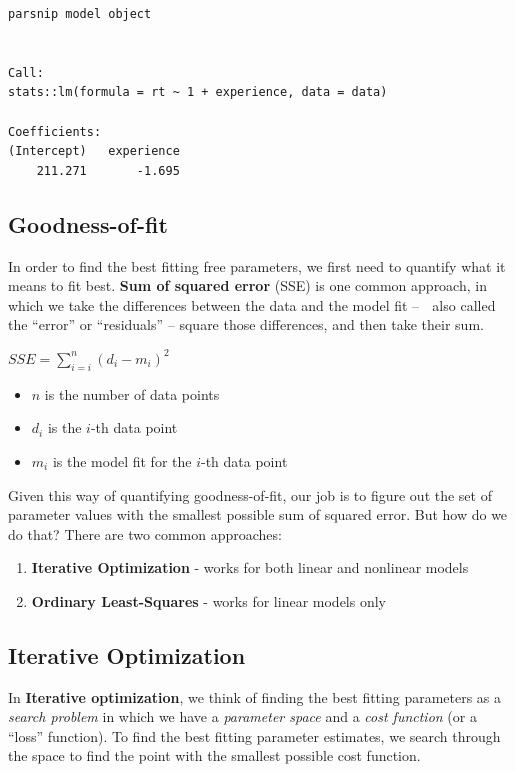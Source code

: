 \documentclass[
  letterpaper,
  DIV=11,
  numbers=noendperiod]{scrartcl}
\providecommand{\tightlist}{%
  \setlength{\itemsep}{0pt}\setlength{\parskip}{0pt}}\usepackage{longtable,booktabs,array}
\begin{document}
\begin{verbatim}
parsnip model object


Call:
stats::lm(formula = rt ~ 1 + experience, data = data)

Coefficients:
(Intercept)   experience  
    211.271       -1.695  
\end{verbatim}

\subsection{Goodness-of-fit}\label{goodness-of-fit}

In order to find the best fitting free parameters, we first need to
quantify what it means to fit best. \textbf{Sum of squared error} (SSE)
is one common approach, in which we take the differences between the
data and the model fit -- 🥸 also called the ``error'' or ``residuals''
-- square those differences, and then take their sum.

\(SSE=\sum_{i=i}^{n} (d_{i} - m_{i})^2\)

\begin{itemize}
\tightlist
\item
  \(n\) is the number of data points
\item
  \(d_i\) is the \(i\)-th data point
\item
  \(m_i\) is the model fit for the \(i\)-th data point
\end{itemize}

Given this way of quantifying goodness-of-fit, our job is to figure out
the set of parameter values with the smallest possible sum of squared
error. But how do we do that? There are two common approaches:

\begin{enumerate}
\def\labelenumi{\arabic{enumi}.}
\tightlist
\item
  \textbf{Iterative Optimization} - works for both linear and nonlinear
  models
\item
  \textbf{Ordinary Least-Squares} - works for linear models only
\end{enumerate}

\subsection{Iterative Optimization}\label{iterative-optimization}

In \textbf{Iterative optimization}, we think of finding the best fitting
parameters as a \emph{search problem} in which we have a \emph{parameter
space} and a \emph{cost function} (or a ``loss'' function). To find the
best fitting parameter estimates, we search through the space to find
the point with the smallest possible cost function.
\end{document}
